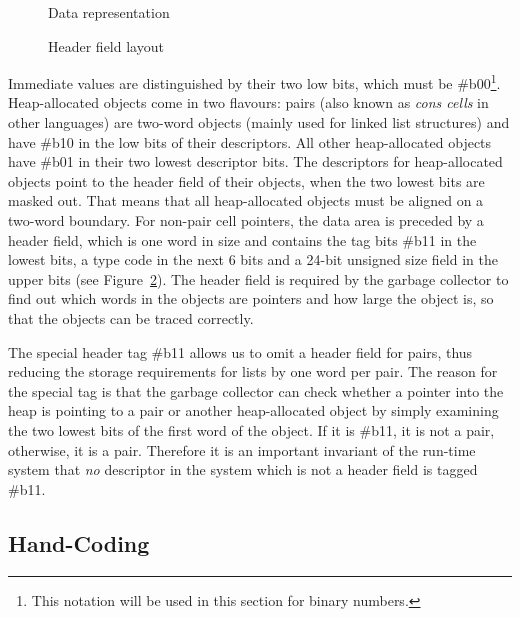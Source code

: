 \begin{figure}[htp]
\begin{center}

\end{center}
\caption{Data representation}%
\label{pic:data-rep}
\end{figure}

\begin{figure}[htp]
\begin{center}

\end{center}
\caption{Header field layout}%
\label{pic:data-header}
\end{figure}

Immediate values are distinguished by their two low bits, which must
be \#b00\footnote{This notation will be used in this section for
  binary numbers.}.  Heap-allocated objects come in two flavours:
pairs (also known as {\em cons cells}%
 in other languages) are two-word objects (mainly
used for linked list structures) and have \#b10 in the low bits of
their descriptors.  All other heap-allocated objects have \#b01 in
their two lowest descriptor bits.  The descriptors for heap-allocated
objects point to the header field of their objects, when the two
lowest bits are masked out.  That means that all heap-allocated
objects must be aligned on a two-word boundary.  For non-pair cell
pointers, the data area is preceded by a header field, which is one
word in size and contains the tag bits \#b11 in the lowest bits, a
type code in the next 6 bits and a 24-bit unsigned size field in the
upper bits (see Figure~\ref{pic:data-header}).  The header field is
required by the garbage collector to find out which words in the
objects are pointers and how large the object is, so that the objects
can be traced correctly.

The special header tag \#b11 allows us to omit a header field for
pairs, thus reducing the storage requirements for lists by one word
per pair.  The reason for the special tag is that the garbage
collector can check whether a pointer into the heap is pointing to a
pair or another heap-allocated object by simply examining the two
lowest bits of the first word of the object.  If it is \#b11, it is
not a pair, otherwise, it is a pair.  Therefore it is an important
invariant of the run-time system that {\em no} descriptor in the
system which is not a header field is tagged \#b11.


\subsection{Hand-Coding}  
\label{sec:handcoding}

